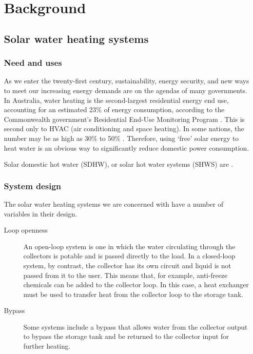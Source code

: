 \chapter{Background}

\section{Solar water heating systems}

\subsection{Need and uses}

As we enter the twenty-first century, sustainability, energy security, and new ways to meet our increasing energy demands are on the agendas of many governments.
In Australia, water heating is the second-largest residential energy end use, accounting for an estimated 23\% of energy consumption, according to the Commonwealth government's Residential End-Use Monitoring Program \cite{REMP12}.
This is second only to HVAC (air conditioning and space heating).
In some nations, the number may be as high as 30\% to 50\% \cite{Lane96}.
Therefore, using `free' solar energy to heat water is an obvious way to significantly reduce domestic power consumption.

Solar domestic hot water (SDHW), or solar hot water systems (SHWS) are .

\subsection{System design}

The solar water heating systems we are concerned with have a number of variables in their design.

\begin{description}
	\item[Loop openness] An open-loop system is one in which the water circulating through the collectors is potable and is passed directly to the load.
		In a closed-loop system, by contrast, the collector has its own circuit and liquid is not passed from it to the user.
		This means that, for example, anti-freeze chemicals can be added to the collector loop.
		In this case, a heat exchanger must be used to transfer heat from the collector loop to the storage tank.
	\item[Bypass] Some systems include a bypass  that allows water from the collector output to bypass the storage tank and be returned to the collector input for further heating.
\end{description}

